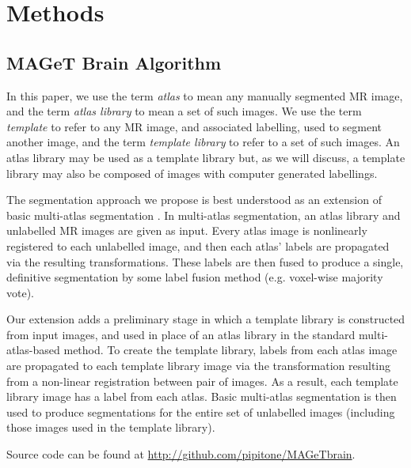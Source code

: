 \documentclass{article}\usepackage{graphicx, color}
\makeatletter
\newenvironment{kframe}{%
 \def\at@end@of@kframe{}%
 \ifinner\ifhmode%
  \def\at@end@of@kframe{\end{minipage}}%
  \begin{minipage}{\columnwidth}%
 \fi\fi%
 \def\FrameCommand##1{\hskip\@totalleftmargin \hskip-\fboxsep
 \colorbox{shadecolor}{##1}\hskip-\fboxsep
     \hskip-\linewidth \hskip-\@totalleftmargin \hskip\columnwidth}%
 \MakeFramed {\advance\hsize-\width
   \@totalleftmargin\z@ \linewidth\hsize
   \@setminipage}}%
 {\par\unskip\endMakeFramed%
 \at@end@of@kframe}
\newcommand{\todo}[1]{\begin{kframe}{\textcolor{red}{TODO #1}}\end{kframe}}
\makeatother
\begin{document}
%
%
\section{Methods}



\subsection{MAGeT Brain Algorithm}
\todo{Make sure we explain what MAGeT stands for}
\todo{reference Chakravarty2012}
In this paper, we use the term {\it atlas} to mean any manually segmented MR
image, and the term {\it atlas library} to mean a set of such images.  We use
the term {\it template} to refer to any MR image, and associated labelling,
used to segment another image, and the term {\it template library} to refer to
a set of such images.  An atlas library may be used as a template library but,
as we will discuss, a template library may also be composed of images with
computer generated labellings. 

The segmentation approach we propose is best understood as an extension of
basic multi-atlas segmentation \citep{Collins2010}.  In multi-atlas segmentation,
an atlas library and unlabelled MR images are given as input.  Every atlas
image is nonlinearly registered to each unlabelled image, and then each atlas'
labels are propagated via the resulting transformations.  These labels are then
fused to produce a single, definitive segmentation by some label fusion method
(e.g.  voxel-wise majority vote). 

Our extension adds a preliminary stage in which a template library is
constructed from input images, and used in place of an atlas library in the
standard multi-atlas-based method.  To create the template library, labels from
each atlas image are propagated to each template library image via the
transformation resulting from a non-linear registration between pair of images.
As a result, each template library image has a label from each atlas.
Basic multi-atlas segmentation is then used to produce segmentations for the
entire set of unlabelled images (including those images used in the template
library). 

Source code can be found at \url{http://github.com/pipitone/MAGeTbrain}.
\end{document}
